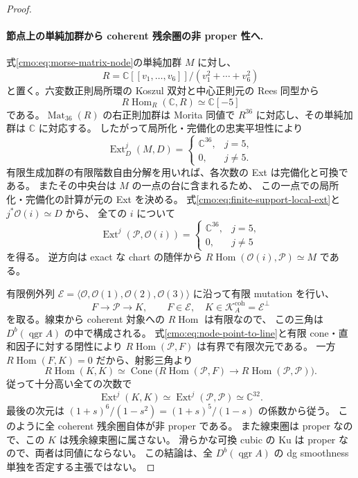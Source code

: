 \begin{proof}
\paragraph{節点上の単純加群から coherent 残余圏の非 proper 性へ.}
式\eqref{cmo:eq:morse-matrix-node}の単純加群 $M$ に対し、
\[
 R=\mathbb C[[v_1,\ldots,v_6]]/(v_1^2+\cdots+v_6^2)
\]
と置く。六変数正則局所環の Koszul 双対と中心正則元の Rees 同型から
\[
 R\operatorname{Hom}_R(\mathbb C,R)\simeq\mathbb C[-5]
\]
である。$\operatorname{Mat}_{36}(R)$ の右正則加群は Morita 同値で
$R^{36}$ に対応し、その単純加群は $\mathbb C$ に対応する。
したがって局所化・完備化の忠実平坦性により
\[
 \operatorname{Ext}^j_D(M,D)=
 \begin{cases}
  \mathbb C^{36},&j=5,\\
  0,&j\ne5.
 \end{cases}
\]
有限生成加群の有限階数自由分解を用いれば、各次数の Ext は完備化と可換である。
またその中央台は $M$ の一点の台に含まれるため、
この一点での局所化・完備化の計算が元の Ext を決める。
式\eqref{cmo:eq:finite-support-local-ext}と $j^*\mathcal O(i)\simeq D$ から、
全ての $i$ について
\begin{equation}\label{cmo:eq:node-point-to-line}
 \operatorname{Ext}^j(\mathcal P,\mathcal O(i))=
 \begin{cases}
  \mathbb C^{36},&j=5,\\
  0,&j\ne5
 \end{cases}
\end{equation}
を得る。
逆方向は exact な chart の随伴から
$R\operatorname{Hom}(\mathcal O(i),\mathcal P)\simeq M$ である。

有限例外列
$\mathcal E=\langle\mathcal O,\mathcal O(1),\mathcal O(2),\mathcal O(3)\rangle$
に沿って有限 mutation を行い、
\[
 F\longrightarrow\mathcal P\longrightarrow K,
 \qquad F\in\mathcal E,\quad
 K\in\mathcal K_A^{\mathrm{coh}}=\mathcal E^\perp
\]
を取る。線束から coherent 対象への $R\operatorname{Hom}$ は有限なので、
この三角は $D^b(\operatorname{qgr}A)$ の中で構成される。
式\eqref{cmo:eq:node-point-to-line}と有限 cone・直和因子に対する閉性により
$R\operatorname{Hom}(\mathcal P,F)$ は有界で有限次元である。
一方 $R\operatorname{Hom}(F,K)=0$ だから、射影三角より
\begin{equation}\label{cmo:eq:node-residual-self-ext}
 R\operatorname{Hom}(K,K)
 \simeq
 \operatorname{Cone}\bigl(
  R\operatorname{Hom}(\mathcal P,F)\longrightarrow
  R\operatorname{Hom}(\mathcal P,\mathcal P)\bigr).
\end{equation}
従って十分高い全ての次数で
\[
 \operatorname{Ext}^j(K,K)
 \simeq\operatorname{Ext}^j(\mathcal P,\mathcal P)
 \simeq\mathbb C^{32}.
\]
最後の次元は
$(1+s)^6/(1-s^2)=(1+s)^5/(1-s)$ の係数から従う。
このように全 coherent 残余圏自体が非 proper である。
また線束圏は proper なので、この $K$ は残余線束圏に属さない。
滑らかな可換 cubic の Ku は proper なので、両者は同値にならない。
この結論は、全 $D^b(\operatorname{qgr}A)$ の dg smoothness 単独を否定する主張ではない。


\end{proof}

